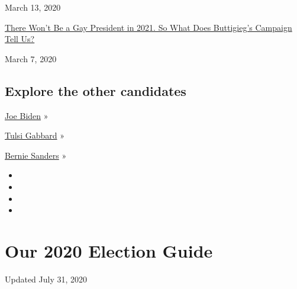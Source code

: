 March 13, 2020

\href{https://www.nytimes.com/2020/03/07/us/politics/pete-buttigieg-gay-president.html}{There
Won't Be a Gay President in 2021. So What Does Buttigieg's Campaign Tell
Us?}

March 7, 2020

\hypertarget{explore-the-other-candidates}{%
\subsection{Explore the other
candidates}\label{explore-the-other-candidates}}

\href{https://www.nytimes.com/interactive/2020/us/elections/joe-biden.html}{Joe
Biden} »

\href{https://www.nytimes.com/interactive/2020/us/elections/tulsi-gabbard.html}{Tulsi
Gabbard} »

\href{https://www.nytimes.com/interactive/2020/us/elections/bernie-sanders.html}{Bernie
Sanders} »

\begin{itemize}
\item
\item
\item
\item
\end{itemize}

\hypertarget{our-2020-election-guide}{%
\section{Our 2020 Election Guide}\label{our-2020-election-guide}}

Updated July 31, 2020

